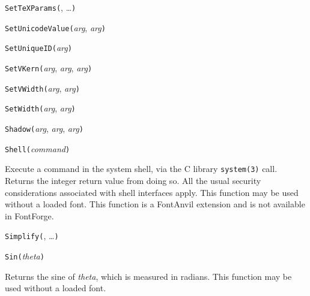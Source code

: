 \texttt{SetTeXParams(}, \ldots\texttt{)}



\texttt{SetUnicodeValue(}\textit{arg}, \textit{arg}\texttt{)}



\texttt{SetUniqueID(}\textit{arg}\texttt{)}



\texttt{SetVKern(}\textit{arg}, \textit{arg}, \textit{arg}\texttt{)}



\texttt{SetVWidth(}\textit{arg}, \textit{arg}\texttt{)}



\texttt{SetWidth(}\textit{arg}, \textit{arg}\texttt{)}



\texttt{Shadow(}\textit{arg}, \textit{arg}, \textit{arg}\texttt{)}



\texttt{Shell(}\textit{command}\texttt{)}

Execute a command in the system shell, via the C library \texttt{system(3)}
call.  Returns the integer return value from doing so.  All the usual
security considerations associated with shell interfaces apply.
This function may be used without a loaded font.  This \FFdiff function is a
FontAnvil extension and is not available in FontForge.



\texttt{Simplify(}, \ldots\texttt{)}



\texttt{Sin(}\textit{theta}\texttt{)}

Returns the sine of \textit{theta}, which is measured in radians.
This function may be used without a loaded font.

